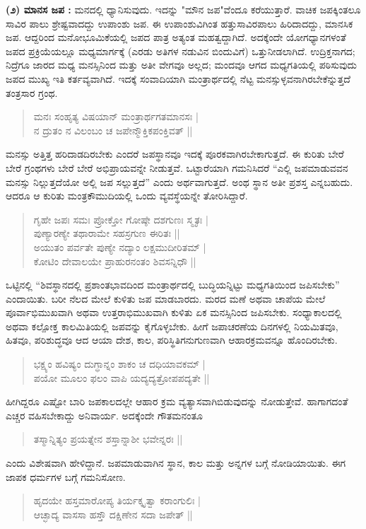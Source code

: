 \textbf{(೨) ಮಾನಸ ಜಪ :} ಮನದಲ್ಲಿ ಧ್ಯಾನಿಸುವುದು. ಇದನ್ನು "ಮೌನ ಜಪ"ವೆಂದೂ ಕರೆಯುತ್ತಾರೆ. ವಾಚಿಕ ಜಪಕ್ಕಿಂತಲೂ ಸಾವಿರ ಪಾಲು ಶ್ರೇಷ್ಟವಾದದ್ದು ಉಪಾಂಶು ಜಪ. ಈ ಉಪಾಂಶುವಿಗಿಂತ ಹತ್ತುಸಾವಿರಪಾಲು ಹಿರಿದಾದದ್ದು, ಮಾನಸಿಕ ಜಪ. ಆದ್ದರಿಂದ ಮನೋಭೂಮಿಕೆಯಲ್ಲಿ ಜಪದ ಪಾತ್ರ ಅತ್ಯಂತ ಮಹತ್ವದ್ದಾಗಿದೆ. ಅದಕ್ಕೆಂದೇ ಯೋಗಧ್ಯಾನಗಳಂತೆ ಜಪದ ಪ್ರಕ್ರಿಯೆಯಲ್ಲೂ ಮಧ್ಯಮಾರ್ಗಕ್ಕೆ (ಎರಡು ಅತಿಗಳ ನಡುವಿನ ಬಿಂದುವಿಗೆ) ಒತ್ತುನೀಡಲಾಗಿದೆ. ಉದ್ರಿಕ್ತನಾಗದ; ನಿದ್ರೆಗೂ ಜಾರದ ಮಧ್ಯ ಮನಸ್ಸಿನಿಂದ ಮತ್ತು ಅತೀ ವೇಗವೂ ಅಲ್ಲದ; ಮಂದವೂ ಆಗದ ಮಧ್ಯಗತಿಯಲ್ಲಿ ಪಠಿಸುವುದು ಜಪದ ಮುಖ್ಯ ಇತಿ ಕರ್ತವ್ಯವಾಗಿದೆ. ಇದಕ್ಕೆ ಸಂವಾದಿಯಾಗಿ ಮಂತ್ರಾರ್ಥದಲ್ಲಿ ನೆಟ್ಟ ಮನಸ್ಸುಳ್ಳವನಾಗಿರಬೇಕೆನ್ನುತ್ತದೆ ತಂತ್ರಸಾರ ಗ್ರಂಥ.
\begin{verse}
ಮನಃ ಸಂಹೃತ್ಯ ವಿಷಯಾನ್ ಮಂತ್ರಾರ್ಥಗತಮಾನಸಃ |\\
ನ ದ್ರುತಂ ನ ವಿಲಂಬಂ ಚ ಜಪೇನ್ಮೌಕ್ತಿಕಪಂಕ್ತಿವತ್ ||
\end{verse}
ಮನಸ್ಸು ಅತ್ತಿತ್ತ ಹರಿದಾಡದಿರಬೇಕು ಎಂದರೆ ಜಪಸ್ಥಾನವೂ ಇದಕ್ಕೆ ಪೂರಕವಾಗಿರಬೇಕಾಗುತ್ತದೆ. ಈ ಕುರಿತು ಬೇರೆ ಬೇರೆ ಗ್ರಂಥಗಳು ಬೇರೆ ಬೇರೆ ಅಭಿಪ್ರಾಯವನ್ನೇ ನೀಡುತ್ತವೆ. ಒಟ್ಟಾರೆಯಾಗಿ ಗಮನಿಸಿದರೆ “ಎಲ್ಲಿ ಜಪಮಾಡುವವನ ಮನಸ್ಸು ನಿಲ್ಲುತ್ತದೆಯೋ ಅಲ್ಲಿ ಜಪ ಸಲ್ಲುತ್ತದೆ” ಎಂದು ಅರ್ಥವಾಗುತ್ತದೆ. ಅಂಥ ಸ್ಥಾನ ಅತೀ ಪ್ರಶಸ್ತ ಎನ್ನಬಹುದು. ಆದರೂ ಆ ಕುರಿತು ಮಂತ್ರಕೌಮುದಿಯಲ್ಲಿ ಒಂದು ವ್ಯವಸ್ಥೆಯನ್ನೇ ತೋರಿಸಿದ್ದಾರೆ.
\begin{verse}
ಗೃಹೇ ಜಪಃ ಸಮಃ ಪ್ರೋಕ್ತೋ ಗೋಷ್ಠೇ ದಶಗುಣಃ ಸ್ಮೃತಃ |\\
ಪುಣ್ಯಾರಣ್ಯೇ ತಥಾರಾಮೇ ಸಹಸ್ರಗುಣ ಈರಿತಃ ||\\
ಅಯುತಂ ಪರ್ವತೇ ಪುಣ್ಯೇ ನದ್ಯಾಂ ಲಕ್ಷಮುದೀರಿತಮ್ |\\
ಕೋಟಿಂ ದೇವಾಲಯೇ ಪ್ರಾಹುರನಂತಂ ಶಿವಸನ್ನಿಧೌ ||
\end{verse}
ಒಟ್ಟಿನಲ್ಲಿ “ಶಿವಸ್ಥಾನದಲ್ಲಿ ಪ್ರಶಾಂತಭಾವದಿಂದ ಮಂತ್ರಾರ್ಥದಲ್ಲಿ ಬುದ್ಧಿಯನ್ನಿಟ್ಟು ಮಧ್ಯಗತಿಯಿಂದ ಜಪಿಸಬೇಕು” ಎಂದಾಯಿತು. ಬರೀ ನೆಲದ ಮೇಲೆ ಕುಳಿತು ಜಪ ಮಾಡಬಾರದು. ಮರದ ಮಣೆ ಅಥವಾ ಚಾಪೆಯ ಮೇಲೆ ಪೂರ್ವಾಭಿಮುಖವಾಗಿ ಅಥವಾ ಉತ್ತರಾಭಿಮುಖವಾಗಿ ಕುಳಿತು ಏಕ ಮನಸ್ಸಿನಿಂದ ಜಪಿಸಬೇಕು. ಸಂಧ್ಯಾಕಾಲದಲ್ಲಿ ಅಥವಾ ಕಲ್ಪೋಕ್ತ ಕಾಲಮಿತಿಯಲ್ಲಿ ಜಪವನ್ನು ಕೈಗೊಳ್ಳಬೇಕು. ಹೀಗೆ ಜಪಾಚರಣೆಯ ದಿನಗಳಲ್ಲಿ ನಿಯಮಿತವೂ, ಹಿತವೂ, ಪರಿಶುದ್ಧವೂ ಆದ ಆಯಾ ದೇಶ, ಕಾಲ, ಪರಿಸ್ಥಿತಿಗನುಗುಣವಾಗಿ ಆಹಾರಕ್ರಮವನ್ನೂ ಹೊಂದಿರಬೇಕು. 
\begin{verse}
ಭಕ್ಷ್ಯಂ ಹವಿಷ್ಯಂ ದುಗ್ಧಾನ್ನಂ ಶಾಕಂ ಚ ದಧಿಯಾವಕಮ್ | \\
ಪಯೋ ಮೂಲಂ ಫಲಂ ವಾಪಿ ಯದ್ಯದ್ಯತ್ರೋಪಪದ್ಯತೇ || 
\end{verse}
ಹೀಗಿದ್ದರೂ ಎಷ್ಟೋ ಬಾರಿ ಜಪಕಾಲದಲ್ಲೇ ಆಹಾರ ಕ್ರಮ ವ್ಯತ್ಯಾಸವಾಗಿಬಿಡುವುದನ್ನು ನೋಡುತ್ತೇವೆ. ಹಾಗಾಗದಂತೆ ಎಚ್ಚರ ವಹಿಸಬೇಕಾದ್ದು ಅನಿವಾರ್ಯ. ಅದಕ್ಕೆಂದೇ ಗೌತಮನಂತೂ 
\begin{verse}
ತಸ್ಮಾನ್ನಿತ್ಯಂ ಪ್ರಯತ್ನೇನ ಶಸ್ತಾನ್ನಾಶೀ ಭವೇನ್ನರಃ || 
\end{verse}
ಎಂದು ವಿಶೇಷವಾಗಿ ಹೇಳಿದ್ದಾನೆ. ಜಪಮಾಡುವಾಗಿನ ಸ್ಥಾನ, ಕಾಲ ಮತ್ತು ಅನ್ನಗಳ ಬಗ್ಗೆ ನೋಡಿಯಾಯಿತು. ಈಗ ಜಾಪಕ ಧರ್ಮಗಳ ಬಗ್ಗೆ ಗಮನಿಸೋಣ. 
\begin{verse}
ಹೃದಯೇ ಹಸ್ತಮಾರೋಪ್ಯ ತಿರ್ಯಕ್ಕೃತ್ವಾ ಕರಾಂಗುಲಿಃ | \\
ಆಚ್ಛಾದ್ಯ ವಾಸಸಾ ಹಸ್ತೌ ದಕ್ಷಿಣೇನ ಸದಾ ಜಪೇತ್ || 
\end{verse}
